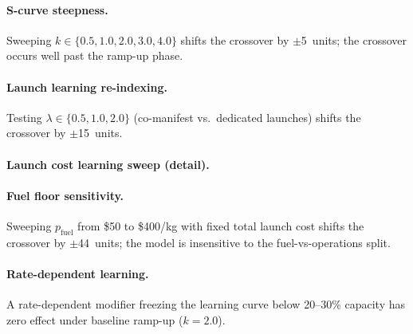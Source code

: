 \documentclass[5p,twocolumn]{elsarticle}
\begin{document}
\paragraph{S-curve steepness.} Sweeping $k \in \{0.5, 1.0, 2.0, 3.0, 4.0\}$ shifts the crossover by $\pm$5~units; the crossover occurs well past the ramp-up phase.

\paragraph{Launch learning re-indexing.} Testing $\lambda \in \{0.5, 1.0, 2.0\}$ (co-manifest vs.\ dedicated launches) shifts the crossover by $\pm$15~units.

\paragraph{Launch cost learning sweep (detail).}

\begin{table}[htbp]
\centering
\caption{Launch cost learning sweep (NPV, $r = 5\%$, lump-sum $K$). The fuel component (\$200/kg) is held constant; the operational component (\$800/kg) follows a Wright learning curve.}
\label{tab:launch_learning}
\small
{}
\end{table}

\paragraph{Fuel floor sensitivity.} Sweeping $p_{\mathrm{fuel}}$ from \$50 to \$400/kg with fixed total launch cost shifts the crossover by $\pm$44~units; the model is insensitive to the fuel-vs-operations split.

\paragraph{Rate-dependent learning.} A rate-dependent modifier freezing the learning curve below 20--30\% capacity has zero effect under baseline ramp-up ($k = 2.0$).
\end{document}
